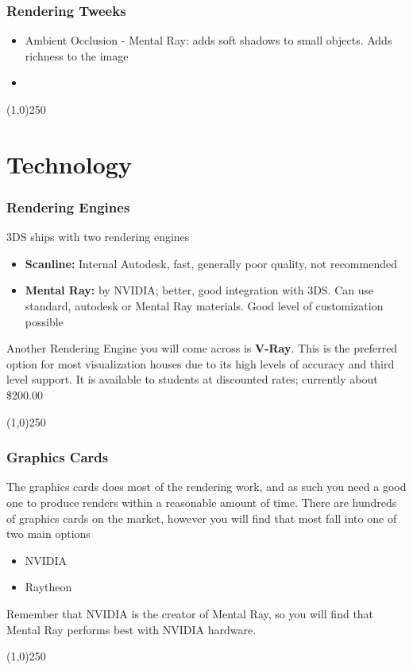 \begin{frame}
\frametitle{Rendering Tweeks}
\begin{itemize}
	\item Ambient Occlusion - Mental Ray: adds soft shadows to small objects.  Adds richness to the image
	\item 
\end{itemize}
\end{frame}
\begin{center}\line(1,0){250}\end{center}





\section{Technology}


\begin{frame}
\frametitle{Rendering Engines}
3DS ships with two rendering engines
\begin{itemize}
	\item \textbf{Scanline:} Internal Autodesk, fast, generally poor quality, not recommended
	\item \textbf{Mental Ray:} by NVIDIA; better, good integration with 3DS.  Can use standard, autodesk or Mental Ray materials.  Good level of customization possible
\end{itemize}
Another Rendering Engine you will come across is \textbf{V-Ray}. This is the preferred option for most visualization houses due to its high levels of accuracy and third level support.  It is available to students at discounted rates; currently about \$200.00
\end{frame}
\begin{center}\line(1,0){250}\end{center}



\begin{frame}
\frametitle{Graphics Cards}
The graphics cards does most of the rendering work, and as such you need a good one to produce renders within a reasonable amount of time.  There are hundreds of graphics cards on the market, however you will find that most fall into one of two main options
\begin{itemize}
	\item NVIDIA
	\item Raytheon
\end{itemize}
Remember that NVIDIA is the creator of Mental Ray, so you will find that Mental Ray performs best with NVIDIA hardware.
\end{frame}
\begin{center}\line(1,0){250}\end{center}


